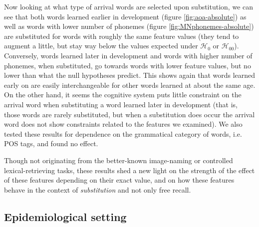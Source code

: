 Now looking at what type of arrival words are selected upon substitution, we can see that both words learned earlier in development (figure \ref{fig:aoa-absolute}) as well as words with lower number of phonemes (figure \ref{fig:MNphonemes-absolute}) are substituted for words with roughly the same feature values (they tend to augment a little, but stay way below the values expected under $\mathcal{H}_0$ or $\mathcal{H}_{00}$). Conversely, words learned later in development and words with higher number of phonemes, when substituted, go towards words with lower feature values, but no lower than what the null hypotheses predict. This shows again that words learned early on are easily interchangeable for other words learned at about the same age. On the other hand, it seems the cognitive system puts little constraint on the arrival word when substituting a word learned later in development (that is, those words are rarely substituted, but when a substitution does occur the arrival word does not show constraints related to the features we examined). We also tested these results for dependence on the grammatical category of words, i.e. POS tags, and found no effect.

Though not originating from the better-known image-naming or controlled lexical-retrieving tasks, these results shed a new light on the strength of the effect of these features depending on their exact value, and on how these features behave in the context of \emph{substitution} and not only free recall.


\subsection{Epidemiological setting}

 



